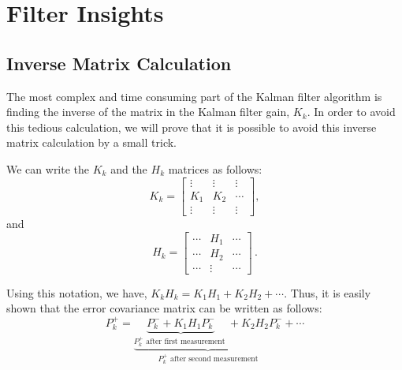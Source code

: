 \documentclass[journal]{IEEEtran}
\begin{document}
\section{Filter Insights}\label{insights}

%
\subsection{Inverse Matrix Calculation}
The most complex and time consuming part of the Kalman filter algorithm is finding the inverse of the matrix in the Kalman filter gain, $K_k$. In order to avoid this tedious calculation, we will prove that it is possible to avoid this inverse matrix calculation by a small trick.\par
We can write the $K_k$ and the $H_k$ matrices as follows:
\begin{equation}
    K_k=\begin{bmatrix}
    \vdots & \vdots & \vdots\\
    K_1    &  K_2 & \cdots\\
     \vdots & \vdots& \vdots
    \end{bmatrix},
\end{equation}
and
\begin{equation}
    H_k=\begin{bmatrix}
    \cdots & H_1 & \cdots\\
    \cdots &  H_2 & \cdots\\
     \cdots & \vdots & \cdots
    \end{bmatrix}\,.
\end{equation}

Using this notation, we have, $K_kH_k= K_1H_1+K_2H_2+\cdots$. Thus, it is easily shown that the error covariance matrix can be written as follows:
\begin{equation}
   P_k^+=\underbrace{\underbrace{P_k^-+K_1H_1 P_k^-}_\text{$P_k^+$ after 
   first measurement }+K_2H_2 P_k^-}_\text{$P_k^+$ after 
   second measurement}+\cdots
\end{equation}
\end{document}
